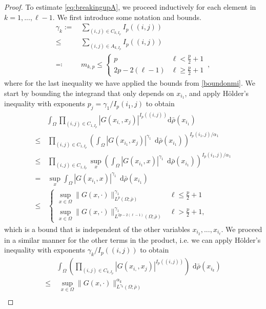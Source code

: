 \documentclass[10pt,a4paper]{amsart}
\newcommand{\dx}[1]{\,\mathrm{d}#1}  %
\begin{document}
\begin{proof}
To estimate \eqref{eq:breakingupA}, we proceed inductively for each element in $k=1,...,\ell-1$. We first introduce some notation and bounds.
\begin{align}
\gamma_k:=& \,\sum_{(i,j)\in C_{k,I_p}}I_p((i,j))\\\leq&\,\sum_{(i,j)\in A_{k,I_p}}I_p((i,j))\\
\eqqcolon&\, m_{k,p}\le \begin{cases}
    p&\ell<\frac{p}{2}+1\\
    2p-2(\ell-1)& \ell\ge \frac{p}{2}+1
\end{cases}
\, ,
\end{align}
where for the last inequality we have applied the bounds from \eqref{boundonmi}.
We start by bounding the integrand that only depends on $x_{i_1}$, and apply H\"older's inequality with exponents $p_j=\gamma_1/I_p(i_1,j)$ to obtain
\begin{align}
&\int_{\Omega}\prod_{(i,j)\in C_{1,I_p}}|G(x_{i,},x_{j})|^{I_p((i,j))}\mathrm{{d}}\bar\rho(x_{i_1})\\
\le & \, \prod_{(i,j)\in C_{1,I_p}} \left(\int_\Omega |G(x_{i_1},x_{j})|^{\gamma_1}\;\dx \bar\rho(x_{i_1})\right)^{I_p(i_1,j)/\alpha_1}\\
\le & \, \prod_{(i,j)\in C_{1,I_p}}\sup_x \left(\int_\Omega |G(x_{i_1},x)|^{\gamma_1}\;\dx \bar\rho(x_{i_1})\right)^{I_p(i_1,j)/\alpha_1}\\
= & \,\sup_x\int_\Omega |G(x_{i_1},x)|^{\gamma_1}\;\dx \bar\rho(x_{i_1})\\
\leq &   \,
 \begin{cases}
  \displaystyle\sup_{x \in \Omega} \lVert  G(x,\cdot)\rVert_{L^p(\Omega;\bar\rho)}^{\gamma_1} & \ell \leq \frac p2 +1 \\
  \displaystyle \sup_{x \in \Omega} \lVert  G(x,\cdot)\rVert_{L^{2p-2(\ell-1)}(\Omega;\bar\rho)}^{\gamma_1} & \ell > \frac p2 +1,
  \end{cases}
\end{align}
which is a bound that is independent of the other variables $x_{i_2},...,x_{i_\ell}$. We proceed in a similar manner for the other terms in the product, i.e. we can apply H\"older's inequality with exponents $\gamma_k/I_p((i,j))$ to obtain
\begin{align}
 &  \int_{\Omega}\left(\prod_{(i,j)\in C_{k,I_p}}|G(x_{i,},x_{j})|^{I_p((i,j))}\right) \, \dx{\bar\rho}(x_{i_k}) \\
\leq & \,  \, \sup_{x \in \Omega} \lVert  G(x,\cdot)\rVert_{L^{\gamma_k}(\Omega;\bar\rho)}^{\alpha_k}\\

\end{align}
\end{proof}
\end{document}
